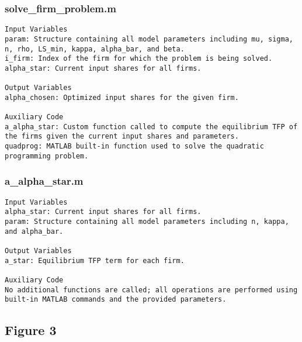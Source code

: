 \documentclass[11pt]{article}
\theoremstyle{definition}
\newcommand{\codepath}{F:/12004835/replication_package_final/replication_package_final}
\begin{document}
	\subsubsection{solve\_firm\_problem.m}
	\begin{lstlisting}[style=Matlab]
Input Variables
param: Structure containing all model parameters including mu, sigma, n, rho, LS_min, kappa, alpha_bar, and beta.
i_firm: Index of the firm for which the problem is being solved.
alpha_star: Current input shares for all firms.

Output Variables
alpha_chosen: Optimized input shares for the given firm.

Auxiliary Code
a_alpha_star: Custom function called to compute the equilibrium TFP of the firms given the current input shares and parameters.
quadprog: MATLAB built-in function used to solve the quadratic programming problem.
	\end{lstlisting}
	
	
	
	\subsubsection{a\_alpha\_star.m}
	\begin{lstlisting}[style=Matlab]
Input Variables
alpha_star: Current input shares for all firms.
param: Structure containing all model parameters including n, kappa, and alpha_bar.

Output Variables
a_star: Equilibrium TFP term for each firm.

Auxiliary Code
No additional functions are called; all operations are performed using built-in MATLAB commands and the provided parameters.
	\end{lstlisting}
	
	
	\subsection{Figure 3}
\end{document}
